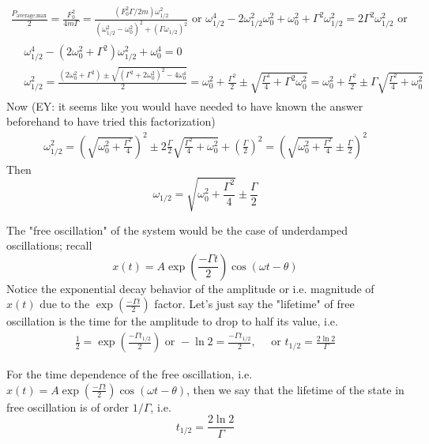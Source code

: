 \[
\begin{gathered}
	\frac{P_{\text{average,max}}}{2} = \frac{F_0^2}{4m \Gamma} = \frac{ (F_0^2 \Gamma /2m ) \omega_{1/2}^2 }{ (\omega_{1/2}^2 - \omega_0^2)^2 + (\Gamma \omega_{1/2})^2 } \text{ or } \omega_{1/2}^4 -2\omega_{1/2}^2 \omega_0^2 + \omega_0^2 + \Gamma^2 \omega_{1/2}^2 = 2\Gamma^2 \omega_{1/2}^2 \text{ or } \\
	\begin{aligned}
		& \omega_{1/2}^4 - (2\omega_0^2 + \Gamma^2) \omega_{1/2}^2 + \omega_0^4 = 0 \\
		& \omega_{1/2}^2 = \frac{ (2 \omega_0^2 + \Gamma^2) \pm \sqrt{ ( \Gamma^2 + 2\omega_0^2)^2 - 4\omega_0^4 } }{2} = \omega_0^2 + \frac{ \Gamma^2}{2} \pm \sqrt{ \frac{\Gamma^4 }{4}  + \Gamma^2 \omega_0^2 } = \omega_0^2 + \frac{ \Gamma^2}{2} \pm \Gamma \sqrt{ \frac{\Gamma^2 }{4}  +  \omega_0^2 }
	\end{aligned}
\end{gathered}
\]
Now (EY: it seems like you would have needed to have known the answer beforehand to have tried this factorization)
\[
\begin{gathered}
	\omega_{1/2}^2 = \left( \sqrt{ \omega_0^2 + \frac{\Gamma^2}{4} } \right)^2 \pm 2 \frac{\Gamma}{2} \sqrt{ \frac{\Gamma^2}{4} + \omega_0^2 } + \left( \frac{\Gamma}{2} \right)^2  = \left( \sqrt{ \omega_0^2 + \frac{ \Gamma^2}{4} } \pm \frac{\Gamma}{2} \right)^2
\end{gathered}
\]
Then
\begin{equation}
	\boxed{ \omega_{1/2} = \sqrt{ \omega_0^2 + \frac{\Gamma^2}{4} } \pm \frac{\Gamma}{2} }
\end{equation}

The "free oscillation" of the system would be the case of underdamped oscillations; recall
\[
x(t) = A \exp{ \left( \frac{-\Gamma t}{2} \right) }\cos{ (\omega t - \theta) }
\]
Notice the exponential decay behavior of the amplitude or i.e. magnitude of $x(t)$ due to the $\exp{ \left( \frac{-\Gamma t}{2} \right)}$ factor. Let's just say the "lifetime" of free oscillation is the time for the amplitude to drop to half its value, i.e.
\[
\begin{gathered}
	\frac{1}{2} = \exp{ \left( \frac{-\Gamma t_{1/2} }{2} \right) } \text{ or } -\ln{2} = \frac{-\Gamma t_{1/2} }{2} , \quad \text{ or } t_{1/2} = \frac{2\ln{2} }{\Gamma}
\end{gathered}
\]

For the time dependence of the free oscillation, i.e. $x(t) = A \exp{ \left( \frac{-\Gamma t}{2} \right) }\cos{ (\omega t - \theta) }$, then we say that the lifetime of the state in free oscillation is of order $1/\Gamma$, i.e.
\[
t_{1/2} = \frac{2\ln{2}}{ \Gamma}
\]

